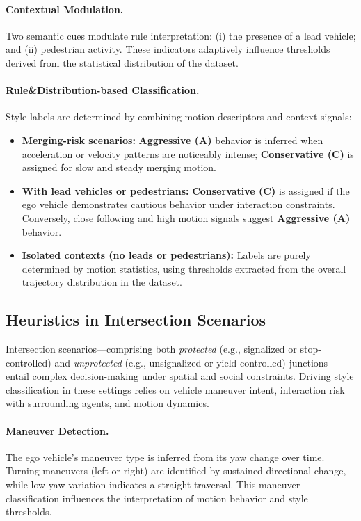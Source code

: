 \documentclass{article}
\begin{document}
\paragraph{Contextual Modulation.}
Two semantic cues modulate rule interpretation: (i) the presence of a lead vehicle; and (ii) pedestrian activity. These indicators adaptively influence thresholds derived from the statistical distribution of the dataset.

\paragraph{Rule\&Distribution-based Classification.}
Style labels are determined by combining motion descriptors and context signals:

\begin{itemize}[leftmargin=1em, topsep=0pt, itemsep=0.3em]
    \item \textbf{Merging-risk scenarios:} \textbf{Aggressive (A)} behavior is inferred when acceleration or velocity patterns are noticeably intense; \textbf{Conservative (C)} is assigned for slow and steady merging motion.
    
    \item \textbf{With lead vehicles or pedestrians:} \textbf{Conservative (C)} is assigned if the ego vehicle demonstrates cautious behavior under interaction constraints. Conversely, close following and high motion signals suggest \textbf{Aggressive (A)} behavior.
    
    \item \textbf{Isolated contexts (no leads or pedestrians):} Labels are purely determined by motion statistics, using thresholds extracted from the overall trajectory distribution in the dataset.
\end{itemize}


\subsection{Heuristics in Intersection Scenarios}

Intersection scenarios—comprising both \textit{protected} (e.g., signalized or stop-controlled) and \textit{unprotected} (e.g., unsignalized or yield-controlled) junctions—entail complex decision-making under spatial and social constraints. Driving style classification in these settings relies on vehicle maneuver intent, interaction risk with surrounding agents, and motion dynamics.

\paragraph{Maneuver Detection.}
The ego vehicle's maneuver type is inferred from its yaw change over time. Turning maneuvers (left or right) are identified by sustained directional change, while low yaw variation indicates a straight traversal. This maneuver classification influences the interpretation of motion behavior and style thresholds.
\end{document}
